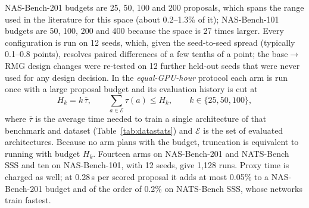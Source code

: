 \documentclass{sadhana}
\begin{document}
NAS-Bench-201 budgets are 25, 50, 100 and 200 proposals, which spans the range used in the literature for this space (about 0.2--1.3\% of it); NAS-Bench-101 budgets are 50, 100, 200 and 400 because the space is 27 times larger. Every configuration is run on 12 seeds, which, given the seed-to-seed spread (typically 0.1--0.8 points), resolves paired differences of a few tenths of a point; the base$\to$RMG design changes were re-tested on 12 further held-out seeds that were never used for any design decision. In the \emph{equal-GPU-hour} protocol each arm is run once with a large proposal budget and its evaluation history is cut at
\begin{equation}
H_k=k\,\bar\tau,\qquad \sum_{a\in\mathcal{E}}\tau(a)\le H_k,\qquad k\in\{25,50,100\},\label{eq:egh}
\end{equation}
where $\bar\tau$ is the average time needed to train a single architecture of that benchmark and dataset (Table~\ref{tab:datastats}) and $\mathcal{E}$ is the set of evaluated architectures. Because no arm plans with the budget, truncation is equivalent to running with budget $H_k$. Fourteen arms on NAS-Bench-201 and NATS-Bench SSS and ten on NAS-Bench-101, with 12 seeds, give 1,128 runs. Proxy time is charged as well; at 0.28\,s per scored proposal it adds at most 0.05\% to a NAS-Bench-201 budget and of the order of 0.2\% on NATS-Bench SSS, whose networks train fastest.
\end{document}
